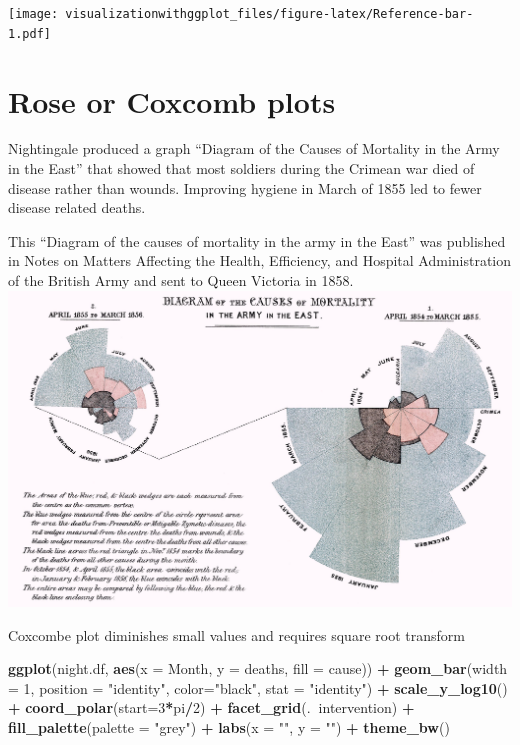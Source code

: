 \documentclass[]{krantz}
\makeatletter
\newenvironment{Shaded}{\begin{snugshade}}{\end{snugshade}}
\newcommand{\KeywordTok}[1]{\textcolor[rgb]{0.13,0.29,0.53}{\textbf{#1}}}
\newcommand{\DataTypeTok}[1]{\textcolor[rgb]{0.13,0.29,0.53}{#1}}
\newcommand{\DecValTok}[1]{\textcolor[rgb]{0.00,0.00,0.81}{#1}}
\newcommand{\StringTok}[1]{\textcolor[rgb]{0.31,0.60,0.02}{#1}}
\newcommand{\OperatorTok}[1]{\textcolor[rgb]{0.81,0.36,0.00}{\textbf{#1}}}
\newcommand{\NormalTok}[1]{#1}
\newenvironment{kframe}{%
\medskip{}
\setlength{\fboxsep}{.8em}
 \def\at@end@of@kframe{}%
 \ifinner\ifhmode%
  \def\at@end@of@kframe{\end{minipage}}%
  \begin{minipage}{\columnwidth}%
 \fi\fi%
 \def\FrameCommand##1{\hskip\@totalleftmargin \hskip-\fboxsep
 \colorbox{shadecolor}{##1}\hskip-\fboxsep
     \hskip-\linewidth \hskip-\@totalleftmargin \hskip\columnwidth}%
 \MakeFramed {\advance\hsize-\width
   \@totalleftmargin\z@ \linewidth\hsize
   \@setminipage}}%
 {\par\unskip\endMakeFramed%
 \at@end@of@kframe}
\renewenvironment{Shaded}{\begin{kframe}}{\end{kframe}}
\theoremstyle{definition}
\theoremstyle{definition}
\theoremstyle{definition}
\theoremstyle{remark}
\makeatother
\begin{document}
\texttt{[image: visualizationwithggplot\_files/figure-latex/Reference-bar-1.pdf]}

\section{Rose or Coxcomb plots}\label{rose-or-coxcomb-plots}

Nightingale produced a graph ``Diagram of the Causes of Mortality in the
Army in the East'' that showed that most soldiers during the Crimean war
died of disease rather than wounds. Improving hygiene in March of 1855
led to fewer disease related deaths.

This ``Diagram of the causes of mortality in the army in the East'' was
published in Notes on Matters Affecting the Health, Efficiency, and
Hospital Administration of the British Army and sent to Queen Victoria
in 1858. \includegraphics{images/Nightingale-mortality.jpg}

Coxcombe plot diminishes small values and requires square root transform

\begin{Shaded}
\begin{Highlighting}[]
\KeywordTok{ggplot}\NormalTok{(night.df, }\KeywordTok{aes}\NormalTok{(}\DataTypeTok{x =}\NormalTok{ Month, }\DataTypeTok{y =}\NormalTok{ deaths, }\DataTypeTok{fill =}\NormalTok{ cause)) }\OperatorTok{+}
\StringTok{  }\KeywordTok{geom_bar}\NormalTok{(}\DataTypeTok{width =} \DecValTok{1}\NormalTok{, }\DataTypeTok{position =} \StringTok{"identity"}\NormalTok{, }\DataTypeTok{color=}\StringTok{"black"}\NormalTok{, }\DataTypeTok{stat =} \StringTok{"identity"}\NormalTok{) }\OperatorTok{+}\StringTok{ }
\StringTok{  }\KeywordTok{scale_y_log10}\NormalTok{() }\OperatorTok{+}\StringTok{ }
\StringTok{  }\KeywordTok{coord_polar}\NormalTok{(}\DataTypeTok{start=}\DecValTok{3}\OperatorTok{*}\NormalTok{pi}\OperatorTok{/}\DecValTok{2}\NormalTok{)  }\OperatorTok{+}
\StringTok{  }\KeywordTok{facet_grid}\NormalTok{(.}\OperatorTok{~}\NormalTok{intervention)  }\OperatorTok{+}
\StringTok{  }\KeywordTok{fill_palette}\NormalTok{(}\DataTypeTok{palette =} \StringTok{"grey"}\NormalTok{) }\OperatorTok{+}
\StringTok{  }\KeywordTok{labs}\NormalTok{(}\DataTypeTok{x =} \StringTok{""}\NormalTok{, }\DataTypeTok{y =} \StringTok{""}\NormalTok{) }\OperatorTok{+}
\StringTok{  }\KeywordTok{theme_bw}\NormalTok{()}
\end{Highlighting}
\end{Shaded}
\end{document}
